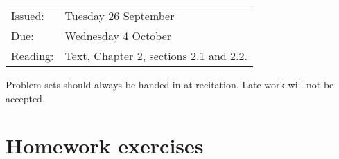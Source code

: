 % 
% 
% 
% 
% 
% 




\evensidemargin 35pt




\medskip

\begin{tabular}{ll}
Issued: & Tuesday 26 September \\
Due: & Wednesday 4 October \\
Reading: & Text, Chapter 2, sections 2.1 and 2.2.
\end{tabular}

\noindent
{\small Problem sets should always be handed in at recitation.  Late work will
not be accepted.}

\section{Homework exercises}

